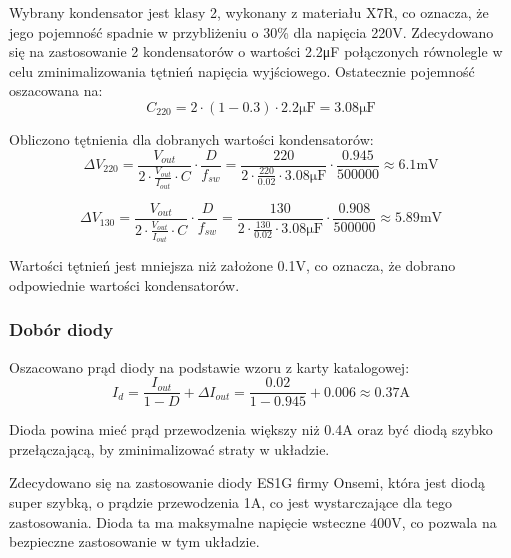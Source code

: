 \documentclass[../../main.tex]{subfiles}
\begin{document}
Wybrany kondensator jest klasy 2, wykonany z materiału X7R, co oznacza, że jego pojemność spadnie w przybliżeniu o 30\% dla napięcia 220\si{\volt}.
Zdecydowano się na zastosowanie 2 kondensatorów o wartości 2.2\si{\micro\farad} połączonych równolegle w celu zminimalizowania tętnień napięcia wyjściowego.
Ostatecznie pojemność oszacowana na:
\begin{equation}
    C_{220} = 2 \cdot (1-0.3) \cdot 2.2\si{\micro\farad} = 3.08\si{\micro\farad}
\end{equation}

Obliczono tętnienia dla dobranych wartości kondensatorów:
\begin{equation}
    \Delta V_{220} = \frac{V_{out}}{2 \cdot \frac{V_{out}}{I_{out}} \cdot C} \cdot \frac{D}{f_{sw}} = \frac{220}{2 \cdot \frac{220}{0.02} \cdot 3.08\si{\micro\farad}} \cdot \frac{0.945}{500000} \approx 6.1\si{\milli\volt}
\end{equation}

\begin{equation}
    \Delta V_{130} = \frac{V_{out}}{2 \cdot \frac{V_{out}}{I_{out}} \cdot C} \cdot \frac{D}{f_{sw}} = \frac{130}{2 \cdot \frac{130}{0.02} \cdot 3.08\si{\micro\farad}} \cdot \frac{0.908}{500000} \approx 5.89\si{\milli\volt}
\end{equation}

Wartości tętnień jest mniejsza niż założone 0.1\si{\volt}, co oznacza, że dobrano odpowiednie wartości kondensatorów.

\subsubsection{Dobór diody}
Oszacowano prąd diody na podstawie wzoru z karty katalogowej:
\begin{equation}
    I_{d} = \frac{I_{out}}{1-D} + \Delta I_{out} = \frac{0.02}{1-0.945} + 0.006 \approx 0.37\si{\ampere}
\end{equation}

Dioda powina mieć prąd przewodzenia większy niż 0.4\si{\ampere} oraz być diodą szybko przełączającą, by zminimalizować straty w układzie.

Zdecydowano się na zastosowanie diody ES1G firmy Onsemi, 
która jest diodą super szybką, o prądzie przewodzenia 1\si{\ampere}, co jest wystarczające dla tego zastosowania.
Dioda ta ma maksymalne napięcie wsteczne 400\si{\volt}, co pozwala na bezpieczne zastosowanie w tym układzie.
\end{document}
